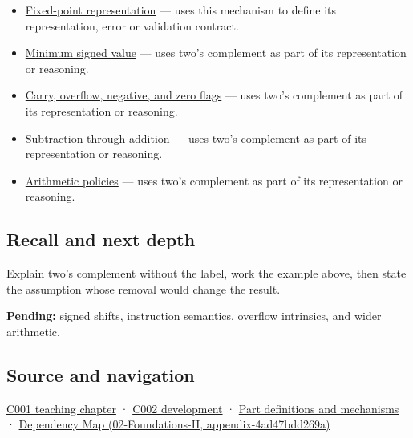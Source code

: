 \begin{itemize}
\item
  \hyperref[appendix-1d0dbe8924cc]{Fixed-point representation} --- uses this mechanism to define its representation, error or validation contract.
\item
  \hyperref[appendix-05f39b10364d]{Minimum signed value} --- uses two's complement as part of its representation or reasoning.
\item
  \hyperref[appendix-8d687c9c08ab]{Carry, overflow, negative, and zero flags} --- uses two's complement as part of its representation or reasoning.
\item
  \hyperref[appendix-1c7df340573e]{Subtraction through addition} --- uses two's complement as part of its representation or reasoning.
\item
  \hyperref[appendix-2ed044358b82]{Arithmetic policies} --- uses two's complement as part of its representation or reasoning.
\end{itemize}

\subsection{Recall and next depth}\label{appendix-4fbc03d20829-recall-and-next-depth}

Explain two's complement without the label, work the example above, then state the assumption whose removal would change the result.

\textbf{Pending:} signed shifts, instruction semantics, overflow intrinsics, and wider arithmetic.

\subsection{Source and navigation}\label{appendix-4fbc03d20829-source-and-navigation}

\hyperref[01-foundations-i-ch001-from-a-signal-to-an-interpretation]{C001 teaching chapter} · \hyperref[01-foundations-i-ch001-arithmetic-becomes-a-policy]{C002 development} · \hyperref[appendix-fd090d982a15]{Part definitions and mechanisms} · \href{../02-Foundations-II/main.pdf\#nameddest=appendix-4ad47bdd269a}{Dependency Map (02-Foundations-II, appendix-4ad47bdd269a)}
